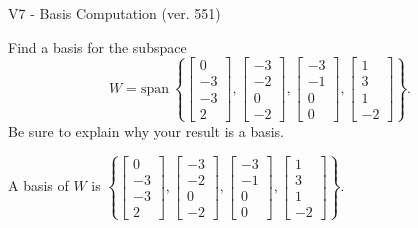 \begin{exercise}
  \begin{exerciseTitle}V7 - Basis Computation (ver. 551)\end{exerciseTitle}
  \begin{exerciseStatement}
    Find a basis for the subspace 
\[W=\mathrm{span}\ \left\{\left[\begin{array}{r}
0 \\
-3 \\
-3 \\
2
\end{array}\right] , \left[\begin{array}{r}
-3 \\
-2 \\
0 \\
-2
\end{array}\right] , \left[\begin{array}{r}
-3 \\
-1 \\
0 \\
0
\end{array}\right] , \left[\begin{array}{r}
1 \\
3 \\
1 \\
-2
\end{array}\right]\right\}.\]
 Be sure to explain why your result is a basis.


  \end{exerciseStatement}
  \begin{exerciseAnswer}
   A basis of \(W\) is  \(\left\{\left[\begin{array}{r}
0 \\
-3 \\
-3 \\
2
\end{array}\right] , \left[\begin{array}{r}
-3 \\
-2 \\
0 \\
-2
\end{array}\right] , \left[\begin{array}{r}
-3 \\
-1 \\
0 \\
0
\end{array}\right] , \left[\begin{array}{r}
1 \\
3 \\
1 \\
-2
\end{array}\right]\right\}\).
  


  \end{exerciseAnswer}
\end{exercise}
